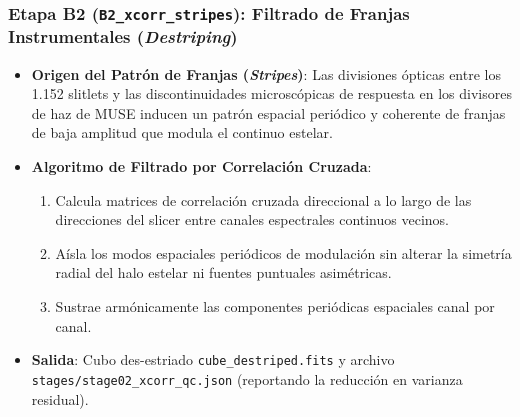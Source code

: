 \documentclass[11pt,a4paper]{article}
\begin{document}
\subsubsection{Etapa B2 (\texttt{B2\_xcorr\_stripes}): Filtrado de Franjas Instrumentales (\textit{Destriping})}
\begin{itemize}[leftmargin=1.0cm]
    \item \textbf{Origen del Patrón de Franjas (\textit{Stripes})}: Las divisiones ópticas entre los 1.152 slitlets y las discontinuidades microscópicas de respuesta en los divisores de haz de MUSE inducen un patrón espacial periódico y coherente de franjas de baja amplitud que modula el continuo estelar.
    \item \textbf{Algoritmo de Filtrado por Correlación Cruzada}:
    \begin{enumerate}
        \item Calcula matrices de correlación cruzada direccional a lo largo de las direcciones del slicer entre canales espectrales continuos vecinos.
        \item Aísla los modos espaciales periódicos de modulación sin alterar la simetría radial del halo estelar ni fuentes puntuales asimétricas.
        \item Sustrae armónicamente las componentes periódicas espaciales canal por canal.
    \end{enumerate}
    \item \textbf{Salida}: Cubo des-estriado \texttt{cube\_destriped.fits} y archivo \texttt{stages/stage02\_xcorr\_qc.json} (reportando la reducción en varianza residual).
\end{itemize}
\end{document}
